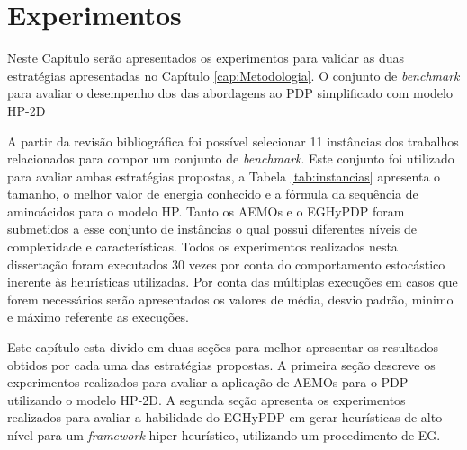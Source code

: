 \chapter{Experimentos}
\label{cap:experimentos}

Neste Capítulo serão apresentados  os experimentos para  validar as duas estratégias apresentadas no Capítulo \ref{cap:Metodologia}. 
O conjunto de \textit{benchmark} para avaliar o desempenho dos das abordagens ao PDP simplificado com modelo HP-2D


A partir da revisão bibliográfica foi possível selecionar 11 instâncias dos trabalhos relacionados \cite{unger1993genetic,krasnogor2002multimeme,shmygelska2002ant,shmygelska2003improved,hsu2003growth} para compor um conjunto de \textit{benchmark}. Este conjunto foi utilizado para avaliar ambas estratégias propostas, a Tabela \ref{tab:instancias} apresenta o tamanho, o melhor valor de energia conhecido e a fórmula da sequência de aminoácidos para o modelo HP. Tanto os AEMOs e o EGHyPDP foram submetidos a esse conjunto de instâncias o qual possui diferentes níveis de complexidade e características. Todos os experimentos realizados nesta dissertação foram executados 30 vezes por conta do comportamento estocástico inerente às heurísticas utilizadas. Por conta das múltiplas execuções em casos que forem necessários serão apresentados os valores de média, desvio padrão, minimo e máximo referente as execuções.


Este capítulo esta divido em duas seções para melhor apresentar os resultados obtidos por cada uma das estratégias propostas. A primeira seção descreve os experimentos realizados para avaliar a aplicação de AEMOs para o PDP utilizando o modelo HP-2D. A segunda seção apresenta os experimentos realizados para avaliar a habilidade do EGHyPDP em gerar heurísticas de alto nível para um \textit{framework} hiper heurístico, utilizando um procedimento de EG.



